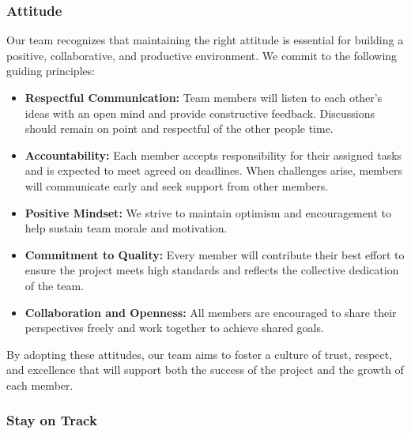 \documentclass{article}
\begin{document}
\subsubsection*{Attitude}
Our team recognizes that maintaining the right attitude is essential for
building a positive, collaborative, and productive environment. We commit to
the following guiding principles:

\begin{itemize}
    \item \textbf{Respectful Communication:} Team members will listen to each
    other’s ideas with an open mind and provide constructive feedback.
    Discussions should remain on point and respectful of the other people time.

    \item \textbf{Accountability:} Each member accepts responsibility for their
    assigned tasks and is expected to meet agreed on deadlines. When
    challenges arise, members will communicate early and seek support from other members.

    \item \textbf{Positive Mindset:} We strive to maintain optimism and
    encouragement to help sustain team morale and motivation.

    \item \textbf{Commitment to Quality:} Every member will contribute their
    best effort to ensure the project meets high standards and reflects the
    collective dedication of the team.

    \item \textbf{Collaboration and Openness:} All members are encouraged to
    share their perspectives freely and work together to achieve shared goals.
\end{itemize}

By adopting these attitudes, our team aims to foster a culture of trust,
respect, and excellence that will support both the success of the project and
the growth of each member.


\subsubsection*{Stay on Track}
\end{document}
